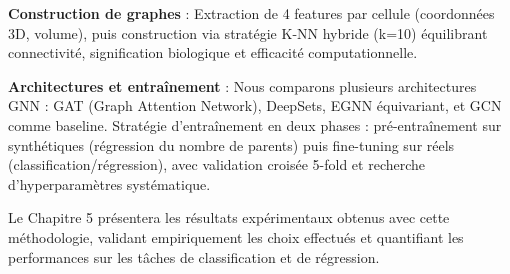 \textbf{Construction de graphes} : Extraction de 4 features par cellule (coordonnées 3D, volume), puis construction via stratégie K-NN hybride (k=10) équilibrant connectivité, signification biologique et efficacité computationnelle.

\textbf{Architectures et entraînement} : Nous comparons plusieurs architectures GNN : GAT (Graph Attention Network), DeepSets, EGNN équivariant, et GCN comme baseline. Stratégie d'entraînement en deux phases : pré-entraînement sur synthétiques (régression du nombre de parents) puis fine-tuning sur réels (classification/régression), avec validation croisée 5-fold et recherche d'hyperparamètres systématique.

Le Chapitre 5 présentera les résultats expérimentaux obtenus avec cette méthodologie, validant empiriquement les choix effectués et quantifiant les performances sur les tâches de classification et de régression.
